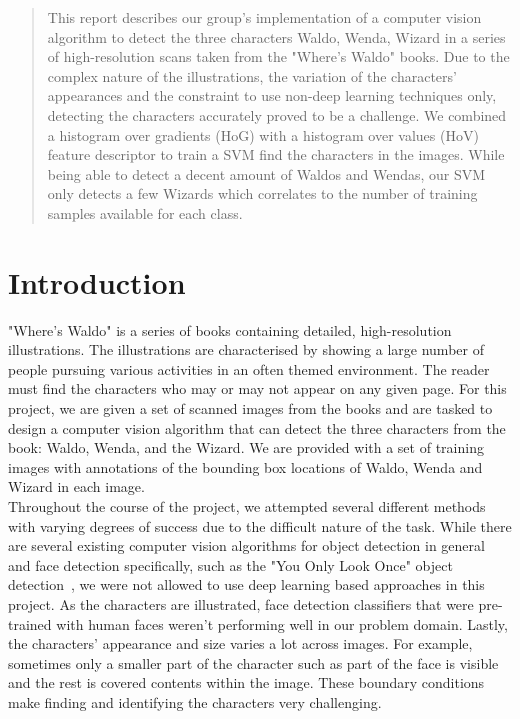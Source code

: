 \documentclass[11pt]{article}
\begin{document}


\begin{abstract}
This report describes our group's implementation of a computer vision algorithm to detect the three
characters Waldo, Wenda, Wizard in a series of high-resolution scans taken from the "Where's Waldo"
books. Due to the complex nature of the illustrations, the variation of the characters' appearances
and the constraint to use non-deep learning techniques only, detecting the characters accurately
proved to be a challenge. We combined a histogram over gradients (HoG) with a histogram over values
(HoV) feature descriptor to train a SVM find the characters in the images. While being able to
detect a decent amount of Waldos and Wendas, our SVM only detects a few Wizards which correlates to
the number of training samples available for each class.
\end{abstract}

\section{Introduction}

"Where's Waldo" is a series of books containing detailed, high-resolution illustrations. The
illustrations are characterised by showing a large number of people pursuing various activities in an
often themed environment. The reader must find the characters who may or may not appear on any given
page. For this project, we are given a set of scanned images from the books and are tasked to design a
computer vision algorithm that can detect the three characters from the book: Waldo, Wenda, and the
Wizard. We are provided with a set of training images with annotations of the bounding box locations of
Waldo, Wenda and Wizard in each image.\\

Throughout the course of the project, we attempted several different methods with varying degrees
of success due to the difficult nature of the task. While there are several existing computer vision
algorithms for object detection in general and face detection specifically, such as the "You Only Look
Once" object detection~\cite{redmon2016yolo}, we were not allowed to use deep learning based approaches
in this project. As the characters are illustrated, face detection classifiers that were pre-trained
with human faces weren't performing well in our problem domain. Lastly, the characters' appearance and size
varies a lot across images. For example, sometimes only a smaller part of the character such as part
of the face is visible and the rest is covered contents within the image. These boundary conditions
make finding and identifying the characters very challenging.\\
\end{document}
